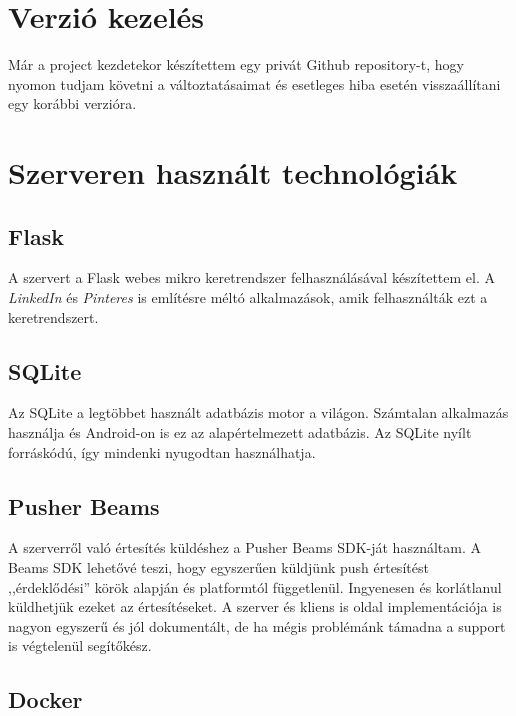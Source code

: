 \documentclass{thesis-ekf}
\theoremstyle{definition}
\theoremstyle{remark}
\begin{document}
\section{Verzió kezelés}

Már a project kezdetekor készítettem egy privát Github repository-t, hogy nyomon tudjam követni a változtatásaimat és esetleges hiba esetén visszaállítani egy korábbi verzióra.


\section{Szerveren használt technológiák}

\subsection*{Flask}

A szervert a Flask webes mikro keretrendszer felhasználásával készítettem el.
A \emph{LinkedIn} és \emph{Pinteres} is említésre méltó alkalmazások, amik felhasználták ezt a keretrendszert.

\subsection*{SQLite}

Az SQLite a legtöbbet használt adatbázis motor a világon. 
Számtalan alkalmazás használja és Android-on is ez az alapértelmezett adatbázis.
Az SQLite nyílt forráskódú, így mindenki nyugodtan használhatja.

\subsection*{Pusher Beams}

A szerverről való értesítés küldéshez a Pusher Beams SDK-ját használtam.
A Beams SDK lehetővé teszi, hogy egyszerűen küldjünk push értesítést ,,érdeklődési'' körök alapján és platformtól függetlenül.
Ingyenesen és korlátlanul küldhetjük ezeket az értesítéseket.
A szerver és kliens is oldal implementációja is nagyon egyszerű és jól dokumentált, de ha mégis problémánk támadna a support is  végtelenül segítőkész.


\subsection*{Docker}\label{docker}
\end{document}
